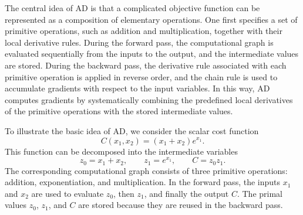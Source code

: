 The central idea of AD is that a complicated objective function can be represented as a composition of elementary operations. One first specifies a set of primitive operations, such as addition and multiplication, together with their local derivative rules. During the forward pass, the computational graph is evaluated sequentially from the inputs to the output, and the intermediate values are stored. During the backward pass, the derivative rule associated with each primitive operation is applied in reverse order, and the chain rule is used to accumulate gradients with respect to the input variables. In this way, AD computes gradients by systematically combining the predefined local derivatives of the primitive operations with the stored intermediate values.

To illustrate the basic idea of AD, we consider the scalar cost function
\begin{equation}
    C(x_1, x_2) = (x_1 + x_2)e^{x_1}.
\end{equation}
This function can be decomposed into the intermediate variables
\begin{equation}
    z_0 = x_1 + x_2, \qquad
    z_1 = e^{x_1}, \qquad
    C = z_0 z_1.
\end{equation}
The corresponding computational graph consists of three primitive operations: addition, exponentiation, and multiplication. In the forward pass, the inputs \(x_1\) and \(x_2\) are used to evaluate \(z_0\), then \(z_1\), and finally the output \(C\). The primal values \(z_0\), \(z_1\), and \(C\) are stored because they are reused in the backward pass.

